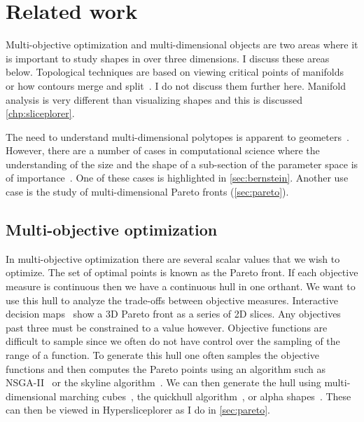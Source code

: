 \section{Related work}
\label{sec:related-work}

Multi-objective optimization and multi-dimensional objects are two areas
where it is important to study shapes in over three dimensions. I discuss 
these areas below. Topological techniques are based on viewing critical points
of manifolds~\cite{Correa:2011,Gerber:2010} or how contours merge and 
split~\cite{Carr:2003a}. I do not discuss them further here. Manifold analysis
is very different than visualizing shapes and this is discussed 
\autoref{chp:sliceplorer}. 

The need to understand multi-dimensional polytopes is apparent to 
geometers~\cite{Ziegler:2012}.
However, there are a number of cases in computational science where the
understanding of the size and the shape of a sub-section of the parameter space
is of importance~\cite{Bergner:2013,Sedlmair:2014}. One of these cases is
highlighted in \autoref{sec:bernstein}. Another use case is the study
of multi-dimensional Pareto fronts (\autoref{sec:pareto}).

\subsection{Multi-objective optimization}

In multi-objective optimization there are several scalar values that we wish to
optimize. The set of optimal points is known as the Pareto front.
If each objective measure is continuous then we have a continuous hull in one
orthant. We want to use this hull to analyze the trade-offs between objective
measures. Interactive decision maps~\cite{Lotov:2004} show a 3D Pareto front as
a series of 2D slices. Any objectives past three must be constrained to a value
however. Objective functions are difficult to sample since we often do
not have control over the sampling of the range of a function.  To
generate this hull one often samples the objective functions and then computes
the Pareto points using an algorithm such as NSGA-II~\cite{Deb:2002} or the
skyline algorithm~\cite{Borzsony:2001}. We can then generate the hull using
multi-dimensional marching cubes~\cite{Bhaniramka:2000}, the quickhull
algorithm~\cite{Barber:1996}, or alpha shapes~\cite{Edelsbrunner:1983}. These
can then be viewed in Hypersliceplorer as I do in \autoref{sec:pareto}.

